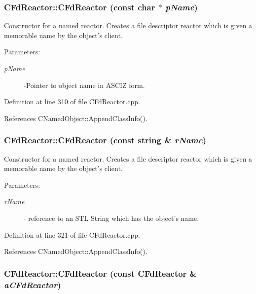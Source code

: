 \subsubsection{\setlength{\rightskip}{0pt plus 5cm}CFd\-Reactor::CFd\-Reactor (const char $\ast$ {\em p\-Name})}\label{classCFdReactor_a1}


Constructor for a named reactor. Creates a file descriptor reactor which is given a memorable name by the object's client. \begin{Desc}
\item[Parameters: ]\par
\begin{description}
\item[{\em 
p\-Name}]-Pointer to object name in ASCIZ form. \end{description}
\end{Desc}


Definition at line 310 of file CFd\-Reactor.cpp.

References CNamed\-Object::Append\-Class\-Info().
\subsubsection{\setlength{\rightskip}{0pt plus 5cm}CFd\-Reactor::CFd\-Reactor (const string \& {\em r\-Name})}\label{classCFdReactor_a2}


Constructor for a named reactor. Creates a file descriptor reactor which is given a memorable name by the object's client. \begin{Desc}
\item[Parameters: ]\par
\begin{description}
\item[{\em 
r\-Name}]- reference to an STL String which has the object's name. \end{description}
\end{Desc}


Definition at line 321 of file CFd\-Reactor.cpp.

References CNamed\-Object::Append\-Class\-Info().
\subsubsection{\setlength{\rightskip}{0pt plus 5cm}CFd\-Reactor::CFd\-Reactor (const CFd\-Reactor \& {\em a\-CFd\-Reactor})\hspace{0.3cm}{\tt  [private]}}\label{classCFdReactor_c0}


